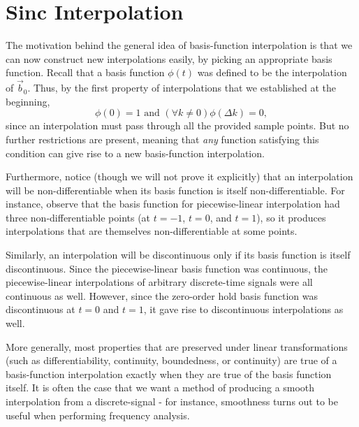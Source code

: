 \documentclass[letterpaper]{article}
\theoremstyle{remark}
\begin{document}
\section{Sinc Interpolation}
The motivation behind the general idea of basis-function interpolation is that we can now construct new interpolations easily, by picking an appropriate basis function. Recall that a basis function $\phi(t)$ was defined to be the interpolation of $\vec{b}_0$. Thus, by the first property of interpolations that we established at the beginning,
\[
    \phi(0) = 1 \text{ and } (\forall k \ne 0) \phi(\Delta k) = 0,
\]
since an interpolation must pass through all the provided sample points. But no further restrictions are present, meaning that \emph{any} function satisfying this condition can give rise to a new basis-function interpolation.

Furthermore, notice (though we will not prove it explicitly) that an interpolation will be non-differentiable when its basis function is itself non-differentiable. For instance, observe that the basis function for piecewise-linear interpolation had three non-differentiable points (at $t = -1$, $t = 0$, and $t = 1$), so it produces interpolations that are themselves non-differentiable at some points. 

Similarly, an interpolation will be discontinuous only if its basis function is itself discontinuous. Since the piecewise-linear basis function was continuous, the piecewise-linear interpolations of arbitrary discrete-time signals were all continuous as well. However, since the zero-order hold basis function was discontinuous at $t = 0$ and $t = 1$, it gave rise to discontinuous interpolations as well.

More generally, most properties that are preserved under linear transformations (such as differentiability, continuity, boundedness, or continuity) are true of a basis-function interpolation exactly when they are true of the basis function itself. It is often the case that we want a method of producing a smooth interpolation from a discrete-signal - for instance, smoothness turns out to be useful when performing frequency analysis. 
\end{document}
